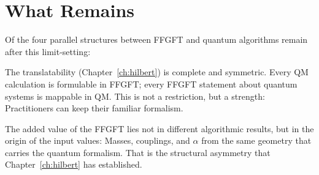 \section{What Remains}

Of the four parallel structures between FFGFT and quantum algorithms
remain after this limit-setting:

The translatability (Chapter~\ref{ch:hilbert}) is complete and
symmetric. Every QM calculation is formulable in FFGFT; every FFGFT statement
about quantum systems is mappable in QM. This is not a restriction,
but a strength: Practitioners can keep their familiar formalism.

The added value of the FFGFT lies not in different algorithmic results,
but in the origin of the input values: Masses, couplings, and
$\alpha$ from the same geometry that carries the quantum formalism. That
is the structural asymmetry that Chapter~\ref{ch:hilbert} has established.

